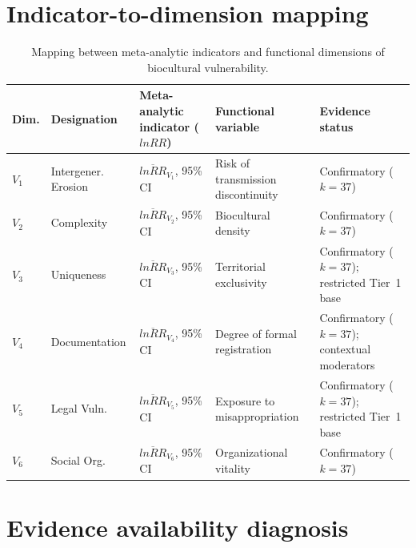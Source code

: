 \documentclass[12pt,a4paper]{article}
\begin{document}
\newpage

\section{Indicator-to-dimension mapping}
\label{app:mapping}

\begin{table}[H]
\caption{Mapping between meta-analytic indicators and functional dimensions of biocultural vulnerability.}
\label{tab:mapping}
\centering
\small
\begin{tabular}{p{0.8cm}p{2.0cm}p{3.5cm}p{2.5cm}p{3.0cm}}
\toprule
\textbf{Dim.} & \textbf{Designation} & \textbf{Meta-analytic indicator ($lnRR$)} & \textbf{Functional variable} & \textbf{Evidence status} \\
\midrule
$V_1$ & Intergener. Erosion & $\overline{lnRR}_{V_1}$, 95\% CI & Risk of transmission discontinuity & Confirmatory ($k = 37$) \\
$V_2$ & Complexity & $\overline{lnRR}_{V_2}$, 95\% CI & Biocultural density & Confirmatory ($k = 37$) \\
$V_3$ & Uniqueness & $\overline{lnRR}_{V_3}$, 95\% CI & Territorial exclusivity & Confirmatory ($k = 37$); restricted Tier~1 base \\
$V_4$ & Documentation & $\overline{lnRR}_{V_4}$, 95\% CI & Degree of formal registration & Confirmatory ($k = 37$); contextual moderators \\
$V_5$ & Legal Vuln. & $\overline{lnRR}_{V_5}$, 95\% CI & Exposure to misappropriation & Confirmatory ($k = 37$); restricted Tier~1 base \\
$V_6$ & Social Org. & $\overline{lnRR}_{V_6}$, 95\% CI & Organizational vitality & Confirmatory ($k = 37$) \\
\bottomrule
\end{tabular}
\end{table}

\newpage

\section{Evidence availability diagnosis}
\label{app:viability}
\end{document}
